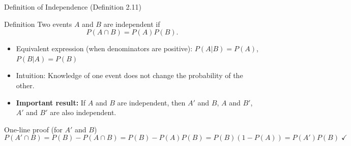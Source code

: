 \documentclass[light]{lutbeamer}
\begin{document}
\begin{frame}{Definition of Independence (Definition 2.11)}
    \begin{block}{Definition}
        Two events \(A\) and \(B\) are independent if
        \[
        P(A\cap B)=P(A)P(B).
        \]
    \end{block}

    \begin{itemize}
        \item Equivalent expression (when denominators are positive): \(P(A|B)=P(A)\), \(P(B|A)=P(B)\)
        \item Intuition: Knowledge of one event does not change the probability of the other.
        \item \textbf{Important result:} If $A$ and $B$ are independent, then $A'$ and $B$,\; $A$ and $B'$,\; $A'$ and $B'$ are also independent.
    \end{itemize}

    \begin{block}{One-line proof (for $A'$ and $B$)}
        \[
        P(A'\cap B)=P(B)-P(A\cap B)=P(B)-P(A)P(B)=P(B)(1-P(A))=P(A')P(B) \;\checkmark
        \]
    \end{block}
\end{frame}
\end{document}
